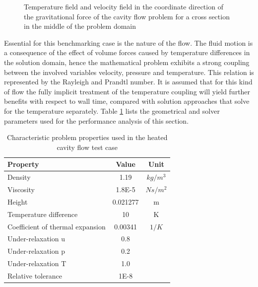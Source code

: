 \begin{figure}[h!]
{\begin{minipage}{0.45\textwidth}
\end{minipage} }
  \caption{Temperature field and velocity field in the coordinate direction of the gravitational force of the cavity flow problem for a cross section in the middle of the problem domain }
  \label{fig:sketchcavity}
\end{figure}

Essential for this benchmarking case is the nature of the flow. The fluid motion is a consequence of the effect of volume forces caused by temperature differences in the solution domain, hence the mathematical problem exhibits a strong coupling between the involved variables velocity, pressure and temperature. This relation is represented by the Rayleigh and Prandtl number. It is assumed that for this kind of flow the fully implicit treatment of the temperature coupling will yield further benefits with respect to wall time, compared with solution approaches that solve for the temperature separately. Table \ref{tab:cavity} lists the geometrical and solver parameters used for the performance analysis of this section.

\begin{table}[h!]\centering
  \caption{Characteristic problem properties used in the heated cavity flow test case}
  \begin{tabular}{lcc}\toprule
    Property & Value & Unit \\
    \midrule
    \rowcolor{black!20} Density            & 1.19      & $kg/m^3$  \\
    \rowcolor{black!00} Viscosity          & 1.8E-5    & $Ns/m^2$  \\
    \rowcolor{black!20} Height             & 0.021277  & m         \\
    \rowcolor{black!00} Temperature difference & 10    & K         \\
    \rowcolor{black!20} Coefficient of thermal expansion & 0.00341 & $1/K$ \\
    \rowcolor{black!00} Under-relaxation u & 0.8       &           \\
    \rowcolor{black!20} Under-relaxation p & 0.2       &           \\
    \rowcolor{black!00} Under-relaxation T & 1.0       &           \\
    \rowcolor{black!20} Relative tolerance & 1E-8      &
  \end{tabular}
  \label{tab:cavity}
\end{table}

